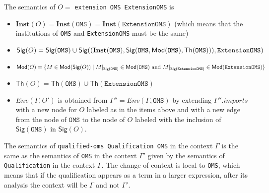 \documentclass[10pt,fleqn,final]{scrreprt}
\newcommand*{\syntax}[1]{\texttt{#1}}
\newcommand{\Sig}{\mathsf{Sig}}
\renewcommand{\Th}{\mathsf{Th}}
\newcommand{\Inst}{\ensuremath{\mathbf{Inst}}}
\newenvironment{definitions}[0]{\medskip }{}
\begin{document}
\begin{definitions}

The semantics of $O=$
\syntax{extension  OMS  ExtensionOMS} is

\begin{itemize}
  \item $\Inst(O) = \Inst(\syntax{OMS}) = \Inst(\syntax{ExtensionOMS})$ 
  (which means that
  the institutions of \syntax{OMS} and 
  \syntax{ExtensionOMS} must be the same)
  \item $\Sig(O) = \Sig(\syntax{OMS}) \cup 
  \Sig((\Inst(\syntax{OMS}), \Sig(\syntax{OMS}, \Mod(\syntax{OMS}), \Th(\syntax{OMS}))),
  \syntax{ExtensionOMS})$
  \item $\Mod(O) = \{ M\in \Mod(\Sig(O)) \mid M\forget{\Sig(\syntax{OMS})} \in \Mod(\syntax{OMS})
  \text{ and }
  M \forget{\Sig(\syntax{ExtensionOMS})} \in \Mod(\syntax{ExtensionOMS})\}$
  \item $\Th(O) = \Th(\syntax{OMS}) \cup \Th(\syntax{ExtensionOMS})$
  \item $Env(\Gamma, O')$ is obtained from 
       $\Gamma'' = Env(\Gamma, \syntax{OMS})$
       by extending $\Gamma''.imports$
       with a new node for $O$ labeled as in the items above and
       with a new edge from the node of $\syntax{OMS}$ to the node of $O$
        labeled with the inclusion of $\Sig(\syntax{OMS})$ in 
        $\Sig(O)$.
\end{itemize}


 
The semantics of \syntax{qualified-oms Qualification OMS}
in the context $\Gamma$ is the same as the
semantics of \syntax{OMS} in the context
$\Gamma'$ given by the semantics of
\syntax{Qualification} in the context $\Gamma$.
The change of context is local to \syntax{OMS}, which
means that if the qualification appears as a term in 
a larger expression, after its analysis the context will
be $\Gamma$ and not $\Gamma'$.



\end{definitions}
\end{document}
